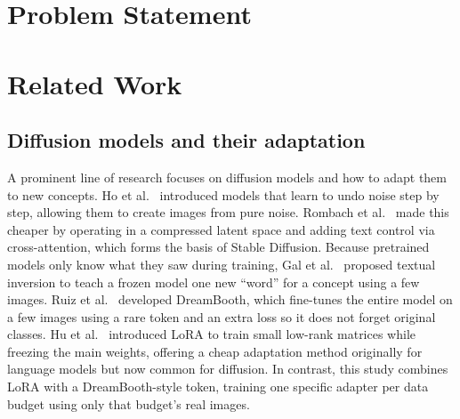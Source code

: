 \documentclass{scrartcl}
\begin{document}
\section{Problem Statement}


\section{Related Work}
\label{sec:related}

\subsection{Diffusion models and their adaptation}
A prominent line of research focuses on diffusion models and how to adapt them to new concepts. Ho et al.~\cite{ho2020denoising} introduced models that learn to undo noise step by step, allowing them to create images from pure noise. Rombach et al.~\cite{rombach2022high} made this cheaper by operating in a compressed latent space and adding text control via cross-attention, which forms the basis of Stable Diffusion. Because pretrained models only know what they saw during training, Gal et al.~\cite{gal2023image} proposed textual inversion to teach a frozen model one new ``word'' for a concept using a few images. Ruiz et al.~\cite{ruiz2023dreambooth} developed DreamBooth, which fine-tunes the entire model on a few images using a rare token and an extra loss so it does not forget original classes. Hu et al.~\cite{hu2022lora} introduced LoRA to train small low-rank matrices while freezing the main weights, offering a cheap adaptation method originally for language models but now common for diffusion. In contrast, this study combines LoRA with a DreamBooth-style token, training one specific adapter per data budget using only that budget's real images.
\end{document}
